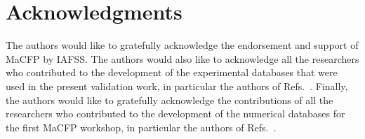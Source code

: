 \documentclass[review,11pt]{elsarticle}
\begin{document}













%

%

%

\section*{Acknowledgments} \label{sec:ack}

The authors would like to gratefully acknowledge the endorsement  and support of MaCFP by IAFSS. The authors would also like to acknowledge all the researchers who contributed to the development of the experimental databases that were used in the present validation work, in particular the authors of Refs.~\cite{Case1_EXP,Case2a_EXP,Case2b_EXP_CH4,Case2b_EXP_H2,Case3_EXP_1,Case3_EXP_2,Case4_EXP_1,Case4_EXP_2,Case5_EXP_1,Case5_EXP_2,Case5_EXP_3}. Finally, the authors would like to gratefully acknowledge the contributions of all the researchers who contributed to the development of the numerical databases for the first MaCFP workshop, in particular the authors of Refs.~\cite{Case1_SIM_IRSN,Case1_SIM_NIST,Case1_SIM_UGent,Case2a_SIM_FMG,Case2a_SIM_UGent,Case2a_SIM_IRSN,Case2a_SIM_NIST,Case2b_SIM_UGent,Case2b_SIM_NIST,Case2b_SIM_SNL,Case2b_SIM_UCantabria,Case3_SIM_UGent,Case3_SIM_UMD,Case3_SIM_VTT,Case4_SIM_NIST,Case4_SIM_FMG,Case5_SIM_FMG,Case5_SIM_NIST,Case5_SIM_UMD}.


\end{document}
